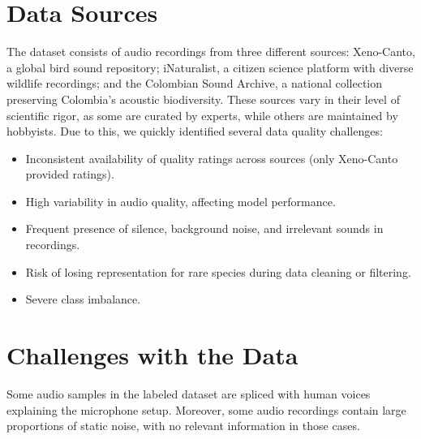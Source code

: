 \documentclass[10pt]{article}
\begin{document}
\section*{Data Sources}

The dataset consists of audio recordings from three different sources: Xeno-Canto, a global bird sound repository; iNaturalist, a citizen science platform with diverse wildlife recordings; and the Colombian Sound Archive, a national collection preserving Colombia's acoustic biodiversity. These sources vary in their level of scientific rigor, as some are curated by experts, while others are maintained by hobbyists. Due to this, we quickly identified several data quality challenges:

\begin{itemize}
  \item Inconsistent availability of quality ratings across sources (only Xeno-Canto provided ratings).
  \item High variability in audio quality, affecting model performance.
  \item Frequent presence of silence, background noise, and irrelevant sounds in recordings.
  \item Risk of losing representation for rare species during data cleaning or filtering.
  \item Severe class imbalance.
\end{itemize}

\section*{Challenges with the Data}

Some audio samples in the labeled dataset are spliced with human voices explaining the microphone setup. Moreover, some audio recordings contain large proportions of static noise, with no relevant information in those cases.
\end{document}
